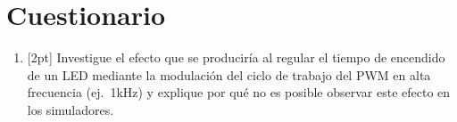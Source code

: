 \documentclass[letterpaper,10.5pt]{article}
\begin{document}

%
%
\section{Cuestionario}%
\label{sec:questionnaire}
\begin{enumerate}
	\item{} [2pt] Investigue el efecto que se produciría al regular el tiempo de encendido de un LED mediante la modulación del ciclo de trabajo del PWM en alta frecuencia (ej.~1kHz) y explique por qué no es posible observar este efecto en los simuladores.
\end{enumerate}
\end{document}
